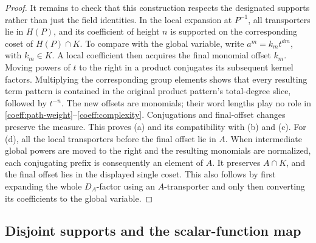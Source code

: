 \begin{proof}
It remains to check that this construction respects the designated
supports rather than just the field identities. In the local expansion
at \(P^{-1}\), all transporters lie in \(H(P)\), and its coefficient
of height \(n\) is supported on the corresponding coset of
\(H(P)\cap K\). To compare with the global variable, write
\(a^m=k_m t^{dm}\), with \(k_m\in K\). A local coefficient then
acquires the final monomial offset \(k_m\). Moving powers of \(t\)
to the right in a product conjugates its subsequent kernel factors.
Multiplying the corresponding group elements shows that every resulting
term pattern is contained in the original product pattern's total-degree
slice, followed by \(t^{-n}\). The new offsets are monomials; their word
lengths play no role in \eqref{coeff:path-weight}--\eqref{coeff:complexity}.
Conjugations and final-offset changes preserve the measure. This proves
(a) and its compatibility with (b) and (c). For (d), all the local
transporters before the final offset lie in \(A\). When intermediate
global powers are moved to the right and the resulting monomials are
normalized, each conjugating prefix is consequently an element of
\(A\). It preserves \(A\cap K\), and the final offset lies in the
displayed single coset. This also follows by first expanding the whole
\(D_A\)-factor using an \(A\)-transporter and only then converting its
coefficients to the global variable.
\end{proof}

\subsection{Disjoint supports and the scalar-function map}

